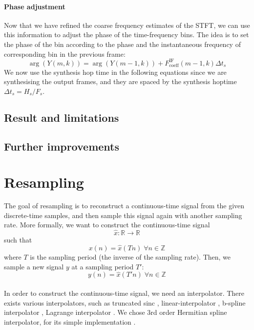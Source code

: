 \documentclass[letterpaper]{article}
\begin{document}
\paragraph{Phase adjustment}
Now that we have refined the coarse frequency estimates of the STFT, we can use
this information to adjust the phase of the time-frequency bins. The idea is to
set the phase of the bin according to the phase and the instantaneous frequency
of corresponding bin in the previous frame:
\begin{equation}
		\arg(Y(m,k))=\arg(Y(m-1,k)) + F_{\text{coeff}}^{\text{IF}}(m-1,k)\Delta t_s
\end{equation}
We now use the synthesis hop time in
the following equations since we are synthesising the output frames, and they
are spaced by the synthesis hoptime \(\Delta t_s=H_s/F_s\).

\subsection{Result and limitations}
\subsection{Further improvements}

\section{Resampling}
The goal of resampling is to reconstruct a continuous-time signal from the given
discrete-time samples, and then sample this signal again with another sampling
rate. More formally, we want to construct the continuous-time signal
\begin{equation}\hat x:\mathbb{R}\to\mathbb{R}\end{equation}
such that
\begin{equation}x(n) = \hat x(Tn) \;\forall n\in\mathbb{Z}\end{equation}
where \(T\) is the sampling period (the inverse of the sampling rate). Then, we
sample a new signal \(y\) at a sampling period \(T'\):
\begin{equation*}y(n) = \hat x(T'n) \;\forall n\in\mathbb{Z}\end{equation*}

\paragraph{}
In order to construct the continuous-time signal, we need an interpolator. There
exists various interpolators, such as truncated sinc
\citep{duncan1988fundamentals, rossum1989an}, linear-interpolator
\citep{rossum1993}, b-spline interpolator \citep{Sankar1998},
Lagrange interpolator \citep{Schafer1973}. We chose 3rd order Hermitian spline
interpolator, for its simple implementation \citep{Grisoni97anhermitian}.
\end{document}

